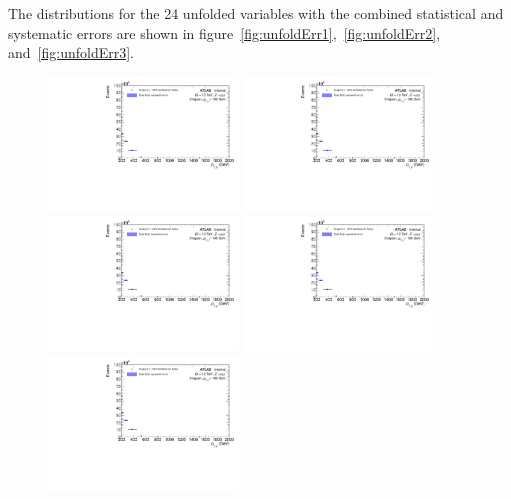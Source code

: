 The distributions for the 24 unfolded variables with the combined statistical and systematic errors are shown in figure~\ref{fig:unfoldErr1},~\ref{fig:unfoldErr2}, and~\ref{fig:unfoldErr3}.

\begin{figure}[h!]
  \centering
  \includegraphics[page=28,width=0.45\textwidth]{figures/unfoldErrPlots.pdf}
  \includegraphics[page=56,width=0.45\textwidth]{figures/unfoldErrPlots.pdf} \\
  \includegraphics[page=112,width=0.45\textwidth]{figures/unfoldErrPlots.pdf}
  \includegraphics[page=140,width=0.45\textwidth]{figures/unfoldErrPlots.pdf} \\
  \includegraphics[page=164,width=0.45\textwidth]{figures/unfoldErrPlots.pdf}

\end{figure}
